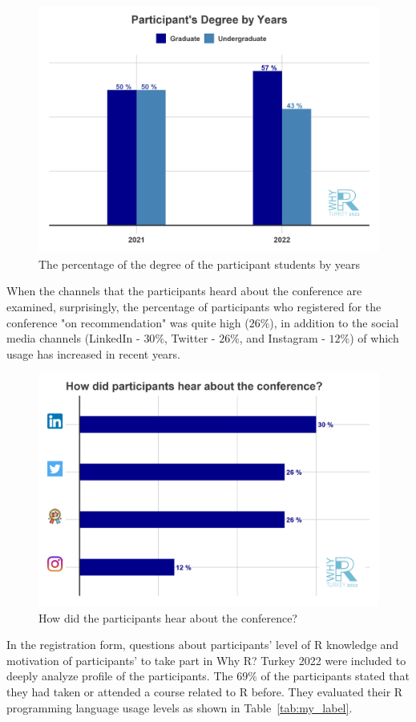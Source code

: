 \begin{figure}[h]
  \centering
  \includegraphics[scale=.45]{part.png}
  \caption{The percentage of the degree of the participant students by years}
  \label{figure:rlogo}
\end{figure}

When the channels that the participants heard about the conference are examined, surprisingly, the percentage of participants who registered for the conference "on recommendation" was quite high ($26\%$), in addition to the social media channels (LinkedIn - $30\%$, Twitter - $26\%$, and Instagram - $12\%$) of which usage has increased in recent years.

\begin{figure}[h]
  \centering
  \includegraphics[scale=.45]{ch.png}
  \caption{How did the participants hear about the conference?}
  \label{figure:rlogo}
\end{figure}
\newpage
In the registration form, questions about participants' level of R knowledge and motivation of participants' to take part in Why R? Turkey 2022 were included to deeply analyze profile of the participants. The $69\%$ of the participants stated that they had taken or attended a course related to R before. They evaluated their R programming language usage levels as shown in Table~\ref{tab:my_label}.

